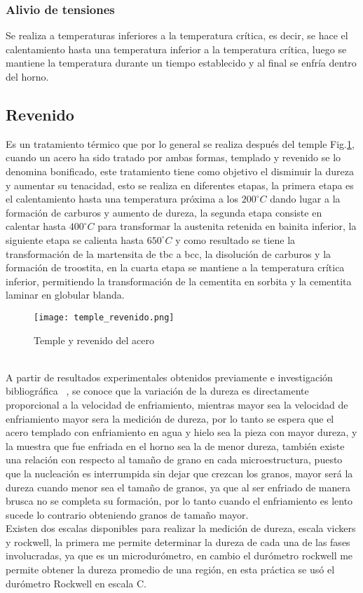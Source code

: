 \documentclass[a4paper, 9pt]{article}
\begin{document}
\subsubsection{Alivio de tensiones}
Se realiza a temperaturas inferiores a la temperatura crítica, es decir, se hace el calentamiento hasta una temperatura inferior a la temperatura crítica, luego se mantiene la temperatura durante un tiempo establecido y al final se enfría dentro del horno.

\subsection{Revenido}
Es un tratamiento térmico que por lo general se realiza después del temple Fig.\ref{temple_revenido}, cuando un acero ha sido tratado por ambas formas, templado y revenido se lo denomina bonificado, este tratamiento tiene como objetivo el disminuir la dureza y aumentar su tenacidad, esto se realiza en diferentes etapas, la primera etapa es el calentamiento hasta una temperatura próxima a los $200^{\circ}C$ dando lugar a la formación de carburos y aumento de dureza, la segunda etapa consiste en calentar hasta $400^{\circ}C$ para transformar la austenita retenida en bainita inferior, la siguiente etapa se calienta hasta $650^{\circ}C$ y como resultado se tiene la transformación de la martensita de tbc a bcc, la disolución de carburos y la formación de troostita, en la cuarta etapa se mantiene a la temperatura crítica inferior, permitiendo la transformación de la cementita en sorbita y la cementita laminar en globular blanda.
\begin{figure}[h!] 
\centering
    \texttt{[image: temple\_revenido.png]}
     \caption{Temple y revenido del acero}
    \label{temple_revenido}
\end{figure}
\
\\
A partir de resultados experimentales obtenidos previamente e investigación bibliográfica ~\cite{dureza}, se conoce que la variación de la dureza es directamente proporcional a la velocidad de enfriamiento, mientras mayor sea la velocidad de enfriamiento mayor sera la medición de dureza, por lo tanto se espera que el acero templado con enfriamiento en agua y hielo sea la pieza con mayor dureza, y la muestra que fue enfriada en el horno sea la de menor dureza, también existe una relación con respecto al tamaño de grano en cada microestructura, puesto que la nucleación es interrumpida sin dejar que crezcan los granos, mayor será la dureza cuando menor sea el tamaño de granos, ya que al ser enfriado de manera brusca no se completa su formación, por lo tanto cuando el enfriamiento es lento sucede lo contrario obteniendo granos de tamaño mayor.  
\\
Existen dos escalas disponibles para realizar la medición de dureza, escala vickers y rockwell, la primera me permite determinar la dureza de cada una de las fases involucradas, ya que es un microdurómetro, en cambio el durómetro rockwell me permite obtener la dureza promedio de una región, en esta práctica se usó el durómetro Rockwell en escala C.
\end{document}
